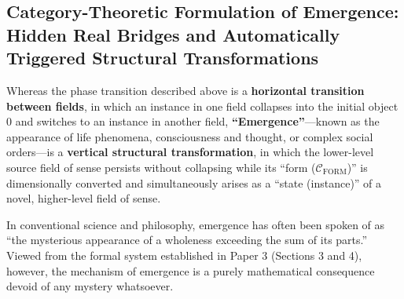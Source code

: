 \documentclass[11pt,a4paper]{article}
\theoremstyle{definition}
\theoremstyle{plain}
\begin{document}
\subsection{Category-Theoretic Formulation of Emergence: Hidden Real Bridges and Automatically Triggered Structural Transformations}
Whereas the phase transition described above is a \textbf{horizontal transition between fields}, in which an instance in one field collapses into the initial object $0$ and switches to an instance in another field, \textbf{``Emergence''}---known as the appearance of life phenomena, consciousness and thought, or complex social orders---is a \textbf{vertical structural transformation}, in which the lower-level source field of sense persists without collapsing while its ``form ($\mathcal{C}_{\mathrm{FORM}}$)'' is dimensionally converted and simultaneously arises as a ``state (instance)'' of a novel, higher-level field of sense.

In conventional science and philosophy, emergence has often been spoken of as ``the mysterious appearance of a wholeness exceeding the sum of its parts.'' Viewed from the formal system established in Paper 3 (Sections 3 and 4), however, the mechanism of emergence is a purely mathematical consequence devoid of any mystery whatsoever.
\end{document}
